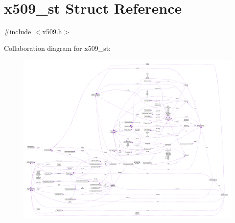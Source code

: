 \hypertarget{structx509__st}{}\section{x509\+\_\+st Struct Reference}
\label{structx509__st}


{\ttfamily \#include $<$x509.\+h$>$}



Collaboration diagram for x509\+\_\+st\+:\nopagebreak
\begin{figure}[H]
\begin{center}
\leavevmode
\includegraphics[width=350pt]{structx509__st__coll__graph}
\end{center}
\end{figure}
